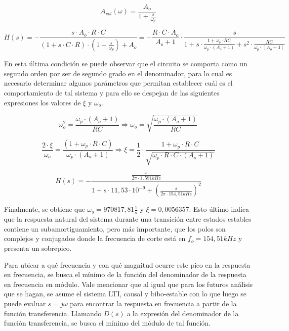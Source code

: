 \begin{equation}
	A_{vol}(\omega) = \frac{A_o}{1 + \frac{s}{\omega_p}}
	\label{eq:derivador_polo_dominante}
\end{equation}

\begin{equation}
	H(s) = - \frac{s \cdot A_{o} \cdot R \cdot C}{(1 + s \cdot C \cdot R) \cdot (1 + \frac{s}{\omega_p}) + A_{o}} = - \frac{R \cdot C \cdot A_{o}}{A_{o} + 1} \cdot \frac{s}{1 + s \cdot \frac{1 + \omega_p \cdot RC}{\omega_p \cdot(A_o + 1)} + s^{2} \cdot \frac{RC}{\omega_p \cdot (A_o + 1)}}
\end{equation}

En esta \'ultima condici\'on se puede observar que el circuito se comporta
como un segundo orden por ser de segundo grado en el denominador, 
para lo cual es necesario determinar algunos par\'ametros que permitan
establecer cu\'al es el comportamiento de tal sistema y para ello se 
despejan de las siguientes expresiones los valores de $\xi$ y $\omega_o$.

\begin{equation*}
	\omega_o^{2} = \frac{\omega_p \cdot (A_o + 1)}{RC} \Rightarrow \omega_o = \sqrt{\frac{\omega_p \cdot (A_o + 1)}{RC}}	
\end{equation*}

\begin{equation*}
	\frac{2 \cdot \xi}{\omega_o} = \frac{(1 + \omega_p \cdot R \cdot C)}{\omega_p \cdot(A_o + 1)}
	\Rightarrow \xi = \frac{1}{2} \cdot \frac{1 + \omega_p \cdot R \cdot C}{\sqrt{\omega_p \cdot R \cdot C \cdot (A_o + 1)}}
\end{equation*}

\begin{equation}
	H(s) = - \frac{\frac{s}{2 \pi \cdot 1,591kHz}}
	{1 + s \cdot 11,53 \cdot 10^{-9} + \left( \frac{s}{2 \pi \cdot 154,51kHz} \right)^{2}}
	\label{eq:derivador_transfer_polo_dominante}
\end{equation}

Finalmente, se obtiene que $\omega_o = 970817,81 \frac{1}{s}$ y $\xi = 0,0056357$. Esto \'ultimo indica que la respuesta natural del sistema durante una transici\'on entre estados estables contiene un subamortiguamiento, pero m\'as importante, que los polos son complejos y conjugados donde la frecuencia de corte est\'a en $f_o = 154,51kHz$ y presenta un sobrepico.

Para ubicar a qu\'e frecuencia y con qu\'e magnitud ocurre este pico en la respuesta en frecuencia, se busca el m\'inimo de la funci\'on del denominador de la respuesta en frecuencia en m\'odulo. Vale mencionar que al igual que para los futuros an\'alisis que se hagan, se asume el sistema LTI, causal y bibo-estable con lo que luego se puede evaluar $s = j \omega$ para encontrar la respuesta en frecuencia a partir de la funci\'on transferencia.
Llamando $D(s)$ a la expresi\'on del denominador de la funci\'on transferencia, se busca el m\'inimo del m\'odulo de tal funci\'on.

